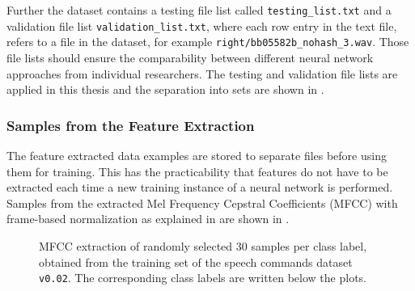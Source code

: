 Further the dataset contains a testing file list called \texttt{testing\_list.txt} and a validation file list \texttt{validation\_list.txt}, where each row entry in the text file, refers to a file in the dataset, for example \texttt{right/bb05582b\_nohash\_3.wav}.
Those file lists should ensure the comparability between different neural network approaches from individual researchers.
The testing and validation file lists are applied in this thesis and the separation into sets are shown in .



\subsubsection{Samples from the Feature Extraction}
The feature extracted data examples are stored to separate files before using them for training.
This has the practicability that features do not have to be extracted each time a new training instance of a neural network is performed.
Samples from the extracted Mel Frequency Cepstral Coefficients (MFCC) with frame-based normalization as explained in  are shown in .
\begin{figure}[!ht]
  \centering
  \caption{MFCC extraction of randomly selected 30 samples per class label, obtained from the training set of the speech commands dataset \texttt{v0.02}. The corresponding class labels are written below the plots.}
  \label{fig:exp_dataset_speech_cmd_mfcc}
\end{figure}

